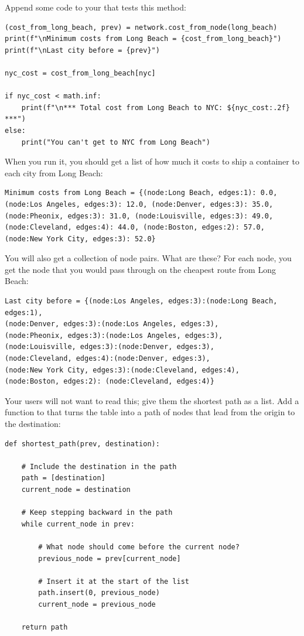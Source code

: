 Append some code to your  that tests this method:

\begin{verbatim}
(cost_from_long_beach, prev) = network.cost_from_node(long_beach)
print(f"\nMinimum costs from Long Beach = {cost_from_long_beach}")
print(f"\nLast city before = {prev}")

nyc_cost = cost_from_long_beach[nyc]

if nyc_cost < math.inf:
    print(f"\n*** Total cost from Long Beach to NYC: ${nyc_cost:.2f} ***")
else:
    print("You can't get to NYC from Long Beach")
\end{verbatim}

When you run it, you should get a list of how much it costs to ship a
container to each city from Long Beach:
\begin{verbatim}
Minimum costs from Long Beach = {(node:Long Beach, edges:1): 0.0,
(node:Los Angeles, edges:3): 12.0, (node:Denver, edges:3): 35.0,
(node:Pheonix, edges:3): 31.0, (node:Louisville, edges:3): 49.0,
(node:Cleveland, edges:4): 44.0, (node:Boston, edges:2): 57.0,
(node:New York City, edges:3): 52.0}
\end{verbatim}

You will also get a collection of node pairs. What are these? For each
node, you get the node that you would pass through on the cheapest
route from Long Beach:
\begin{verbatim}
Last city before = {(node:Los Angeles, edges:3):(node:Long Beach, edges:1),
(node:Denver, edges:3):(node:Los Angeles, edges:3),
(node:Pheonix, edges:3):(node:Los Angeles, edges:3),
(node:Louisville, edges:3):(node:Denver, edges:3),
(node:Cleveland, edges:4):(node:Denver, edges:3),
(node:New York City, edges:3):(node:Cleveland, edges:4),
(node:Boston, edges:2): (node:Cleveland, edges:4)}
\end{verbatim}

Your users will not want to read this; give them the shortest path as a list.  Add a function to
 that turns the  table into a path of
nodes that lead from the origin to the destination:

\begin{verbatim}
def shortest_path(prev, destination):

    # Include the destination in the path
    path = [destination]
    current_node = destination

    # Keep stepping backward in the path
    while current_node in prev:

        # What node should come before the current node?
        previous_node = prev[current_node]

        # Insert it at the start of the list
        path.insert(0, previous_node)
        current_node = previous_node

    return path
\end{verbatim}

